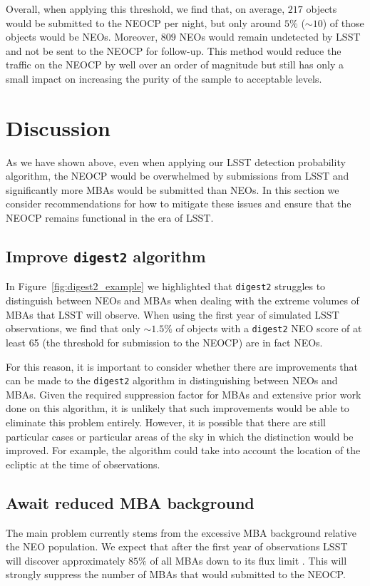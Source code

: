 \documentclass[twocolumn]{aastex631}
\newcommand{\dig}{\texttt{digest2}}
\newcommand{\npernightAlg}{217}
\newcommand{\purityAlg}{5}
\newcommand{\purityAlgRaw}{10}
\newcommand{\neoLostAlg}{809}
\begin{document}
Overall, when applying this threshold, we find that, on average, $\npernightAlg{}$ objects would be submitted to the NEOCP per night, but only around $\purityAlg{}\%$ (${\sim}\purityAlgRaw{}$) of those objects would be NEOs. Moreover, $\neoLostAlg{}$ NEOs would remain undetected by LSST and not be sent to the NEOCP for follow-up. This method would reduce the traffic on the NEOCP by well over an order of magnitude but still has only a small impact on increasing the purity of the sample to acceptable levels.

\section{Discussion} \label{sec:discussion}
As we have shown above, even when applying our LSST detection probability algorithm, the NEOCP would be overwhelmed by submissions from LSST and significantly more MBAs would be submitted than NEOs. In this section we consider recommendations for how to mitigate these issues and ensure that the NEOCP remains functional in the era of LSST.

\subsection{Improve \dig{} algorithm}
In Figure~\ref{fig:digest2_example} we highlighted that \dig{} struggles to distinguish between NEOs and MBAs when dealing with the extreme volumes of MBAs that LSST will observe. When using the first year of simulated LSST observations, we find that only ${\sim}1.5\%$ of objects with a \dig{} NEO score of at least 65 (the threshold for submission to the NEOCP) are in fact NEOs.

For this reason, it is important to consider whether there are improvements that can be made to the \dig{} algorithm in distinguishing between NEOs and MBAs. Given the required suppression factor for MBAs and extensive prior work done on this algorithm, it is unlikely that such improvements would be able to eliminate this problem entirely. However, it is possible that there are still particular cases or particular areas of the sky in which the distinction would be improved. For example, the algorithm could take into account the location of the ecliptic at the time of observations.

\subsection{Await reduced MBA background}
The main problem currently stems from the excessive MBA background relative the NEO population. We expect that after the first year of observations LSST will discover approximately $85\%$ of all MBAs down to its flux limit \citep{Juric+2020}. This will strongly suppress the number of MBAs that would submitted to the NEOCP.
\end{document}
